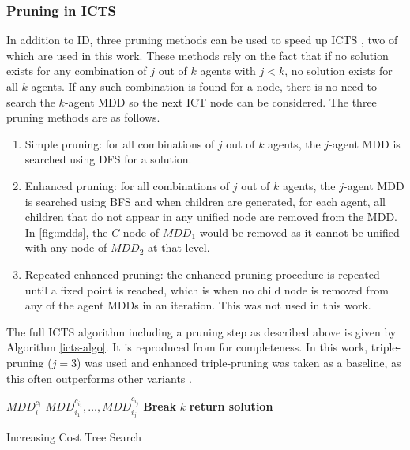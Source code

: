 \documentclass[english]{article}
\begin{document}
	\subsubsection{Pruning in ICTS}
	\label{pruning}
	In addition to ID, three pruning methods can be used to speed up ICTS \cite{sharon2013}, two of which are used in this work. These methods rely on the fact that if no solution exists for any combination of $j$ out of $k$ agents with $j < k$, no solution exists for all $k$ agents. If any such combination is found for a node, there is no need to search the $k$-agent MDD so the next ICT node can be considered. The three pruning methods are as follows.
	\begin{enumerate}
		\item Simple pruning: for all combinations of $j$ out of $k$ agents, the $j$-agent MDD is searched using DFS for a solution.
		\item Enhanced pruning: for all combinations of $j$ out of $k$ agents, the $j$-agent MDD is searched using BFS and when children are generated, for each agent, all children that do not appear in any unified node are removed from the MDD. In \ref{fig:mdds}, the $C$ node of $MDD_1$ would be removed as it cannot be unified with any node of $MDD_2$ at that level.
		\item Repeated enhanced pruning: the enhanced pruning procedure is repeated until a fixed point is reached, which is when no child node is removed from any of the agent MDDs in an iteration. This was not used in this work. 
	\end{enumerate}
	The full ICTS algorithm including a pruning step as described above is given by Algorithm \ref{icts-algo}. It is reproduced from \cite{sharon2013} for completeness. In this work, triple-pruning ($j=3$) was used and enhanced triple-pruning was taken as a baseline, as this often outperforms other variants \cite{sharon2013}.
	\begin{algorithm}
		\begin{algorithmic}[1]
			\State {}
			 $MDD_i^{c_i}$
			\EndFor
			\State {}$MDD_{i_1}^{c_{i_1}},\ldots,MDD_{i_j}^{c_{i_j}}$
			\State \textbf{Break}
			\EndIf
			\EndFor
			\State {}$k$
			\State \textbf{return solution}
			\EndIf
			\EndFor
			
			\EndProcedure
		\end{algorithmic}
		\caption{Increasing Cost Tree Search}
		\label{icts-algo}
	\end{algorithm}
\end{document}
